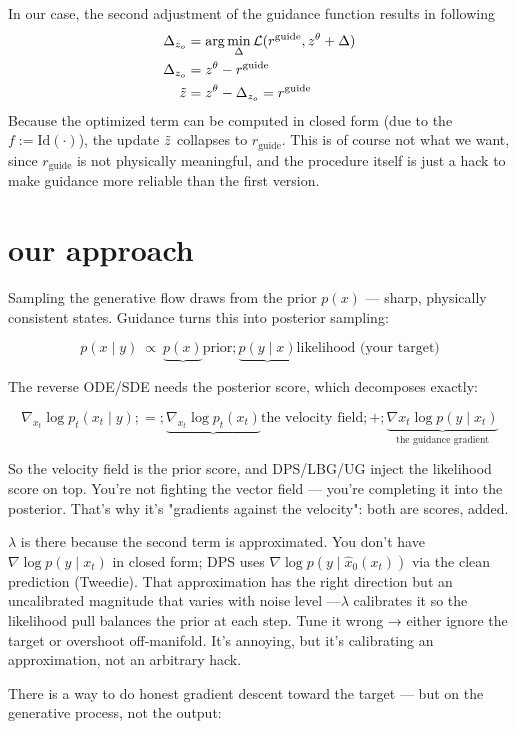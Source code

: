 \documentclass[a4paper,12pt]{article}
\begin{document}
In our case, the second adjustment of the guidance function results in following
\begin{align*}
    \Delta_{z_o} &= \arg\min_\Delta \mathcal{L}(r^{\text{guide}}, z^\theta + \Delta) \\
    \Delta_{z_o} &= z^\theta - r^{\text{guide}} \\
    \Tilde{z} &= z^\theta - \Delta_{z_o} = r^{\text{guide}}
\end{align*}
Because the optimized term can be computed in closed form (due to the $f:=\text{Id}(\cdot)$), the update $\Tilde{z}$ collapses to $r_{\text{guide}}$.
This is of course not what we want, since $r_{\text{guide}}$ is not physically meaningful, and the procedure itself is just a hack to make guidance more reliable than the first version.


\section{our approach}

Sampling the generative flow draws from the prior $p(x)$ — sharp, physically consistent states. Guidance turns this into posterior sampling:

$$p(x\mid y)\ \propto\ \underbrace{p(x)}{\text{prior}};\underbrace{p(y\mid x)}{\text{likelihood (your target)}}$$

The reverse ODE/SDE needs the posterior score, which decomposes exactly:

$$\nabla_{x_t}\log p_t(x_t\mid y);=;\underbrace{\nabla_{x_t}\log p_t(x_t)}{\text{the velocity field}};+;\underbrace{\nabla{x_t}\log p(y\mid x_t)}_{\text{the guidance gradient}}$$

So the velocity field is the prior score, and DPS/LBG/UG inject the likelihood score on top. You're not fighting the vector field — you're completing it into the posterior. That's why it's "gradients against the velocity": both are scores, added.

$\lambda$ is there because the second term is approximated. You don't have $\nabla\log p(y\mid x_t)$ in closed form; DPS uses $\nabla\log p(y\mid \hat x_0(x_t))$ via the clean prediction (Tweedie). That approximation has the right direction but an uncalibrated magnitude that varies with noise level —$\lambda$ calibrates it so the likelihood pull balances the prior at each step. Tune it wrong → either ignore the target or overshoot off-manifold. It's annoying, but it's calibrating an approximation, not an arbitrary hack.

There is a way to do honest gradient descent toward the target — but on the generative process, not the output:
\end{document}
